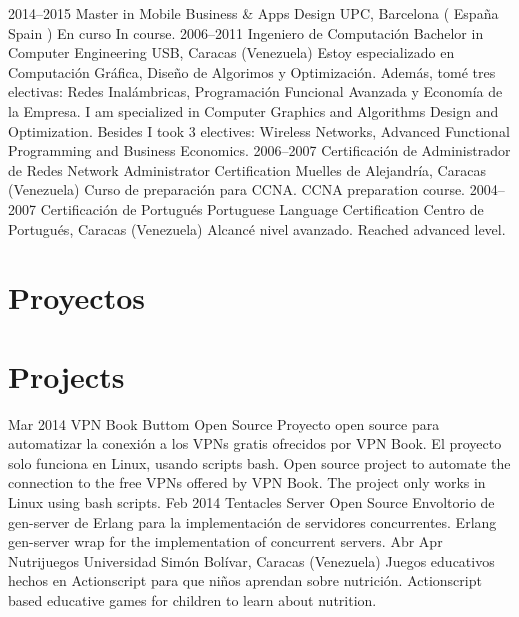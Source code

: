 \documentclass[]{friggeri-cv} %
\newcommand{\chl}[2]{
    \ifdefined\isspanish
        #2
    \else
        #1
    \fi
}
\newcommand{\chlsection}[2]{
    \ifdefined\isspanish
        \section{#2}
    \else
        \section{#1}
    \fi
}
\begin{document}
\begin{entrylist}
\entry
{2014--2015}
{Master {\normalfont in Mobile Business \& Apps Design}}
{UPC, Barcelona (\chl{Spain}{España})}
{\chl{In course.}{En curso}}
\entry
{2006--2011}
{\chl{Bachelor {\normalfont in Computer Engineering}}{Ingeniero de Computación}}
{USB, Caracas (Venezuela)}
{\chl{I am specialized in Computer Graphics and Algorithms Design and Optimization.
Besides I took 3 electives: Wireless Networks, Advanced Functional Programming
and Business Economics.}{Estoy especializado en Computación Gráfica, Diseño de
Algorimos y Optimización. Además, tomé tres electivas: Redes Inalámbricas,
Programación Funcional Avanzada y Economía de la Empresa.}}
\entry
{2006--2007}
{\chl{Network Administrator Certification}{Certificación de Administrador de Redes}}
{Muelles de Alejandría, Caracas (Venezuela)}
{\chl{CCNA preparation course.}{Curso de preparación para CCNA.}}
\entry
{2004--2007}
{\chl{Portuguese Language Certification}{Certificación de Portugués}}
{Centro de Portugués, Caracas (Venezuela)}
{\chl{Reached advanced level.}{Alcancé nivel avanzado.}}
\end{entrylist}


\chlsection{Projects}{Proyectos}

\begin{entrylist}
\entry
{Mar 2014}
{VPN Book Buttom}
{Open Source}
{\chl{Open source project to automate the connection to the free VPNs offered by VPN
Book. The project only works in Linux using bash scripts.}{Proyecto open source
para automatizar la conexión a los VPNs gratis ofrecidos por VPN Book. El proyecto
solo funciona en Linux, usando scripts bash.}}
\entry
{Feb 2014}
{Tentacles Server}
{Open Source}
{\chl{Erlang gen-server wrap for the implementation of concurrent servers.}{Envoltorio
de gen-server de Erlang para la implementación de servidores concurrentes.}}
\entry
{\chl{Apr}{Abr} 2011}
{Nutrijuegos}
{Universidad Simón Bolívar, Caracas (Venezuela)}
{\chl{Actionscript based educative games for children to learn about nutrition.}{Juegos
educativos hechos en Actionscript para que niños aprendan sobre nutrición.}}
\end{entrylist}

\end{document}
